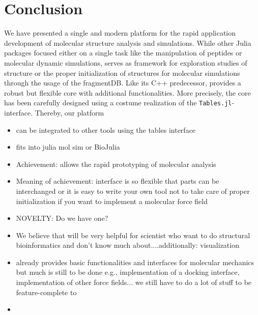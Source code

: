 
\section{Conclusion}

We have presented a single and modern platform for the rapid application development of molecular structure analysis and simulations. While other Julia packages focused either on a single task like the manipulation of peptides or molecular dynamic simulations, \biochem serves as framework for exploration studies of structure or the proper initialization of structures for molecular simulations through the usage of the fragmentDB. Like its C++ predecessor, \biochem provides a robust but flexible core with additional functionalities. More precisely, the core has been carefully designed using a costume realization of the \texttt{Tables.jl}-interface. Thereby, our platform 
\begin{itemize}
	\item can be integrated to other tools using the tables interface
	\item fits into julia mol sim or BioJulia
	\item Achievement: \biochem allows the rapid prototyping of molecular analysis 
	\item Meaning of achievement: interface is so flexible that parts can be interchanged or it is easy to write your own tool not to take care of proper initialization if you want to implement a molecular force field 
	\item NOVELTY: Do we have one? 
	\item We believe that \biochem will be very helpful for scientist who want to do structural bioinformatics and don't know much about....additionally: visualization
	\item \biochem already provides basic functionalities and interfaces for molecular mechanics but much is still to be done e.g., implementation of a docking interface, implementation of other force fields... we still have to do a lot of stuff to be feature-complete to \ball
	\item 
\end{itemize}